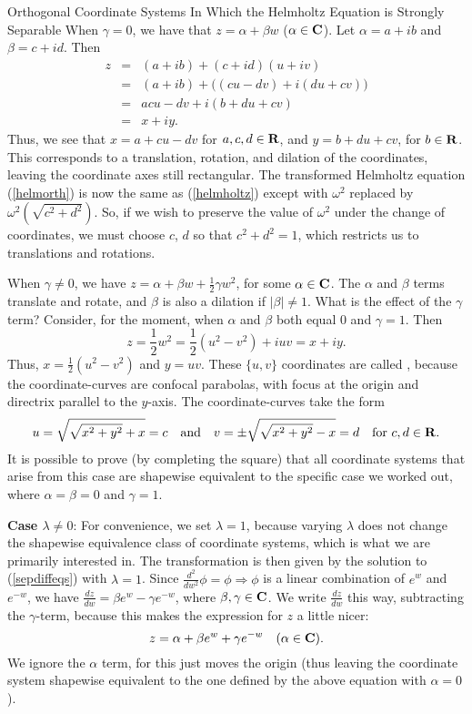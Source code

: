 \begin{section}{Orthogonal Coordinate Systems In Which the Helmholtz Equation is Strongly Separable}
When $\gamma = 0$, we have that $z = \alpha + \beta w$ ($\alpha \in \mathbf{C}$).  Let $\alpha = a + ib$ and $\beta = c + id$.  Then
\begin{eqnarray*}
z &=& (a + ib) + (c + id)(u + iv) \\
  &=& (a + ib) + \big( (cu - dv) + i(du + cv)\big) \\
  &=& a cu - dv + i(b + du + cv) \\
  &=& x + iy.
\end{eqnarray*}
Thus, we see that $x = a + c u - d v$ for $a, c, d \in \mathbf{R}$, and $y = b + d u + c v$, for $b \in \mathbf{R}$.  This corresponds to a translation, rotation, and dilation of the coordinates, leaving the coordinate axes still rectangular.  The transformed Helmholtz equation (\ref{helmorth}) is now the same as (\ref{helmholtz}) except with $\omega^2$ replaced by $\omega^2(\sqrt{c^2 + d^2})$.  So, if we wish to preserve the value of $\omega^2$ under the change of coordinates, we must choose $c$, $d$ so that $c^2 + d^2 = 1$, which restricts us to translations and rotations.

When $\gamma \not= 0$, we have $z = \alpha + \beta w + \frac{1}{2} \gamma w^2$, for some $\alpha \in \mathbf{C}$.  The $\alpha$ and $\beta$ terms translate and rotate, and $\beta$ is also a dilation if $| \beta | \not= 1$.  What is the effect of the $\gamma$ term?  Consider, for the moment, when $\alpha$ and $\beta$ both equal $0$ and $\gamma = 1$.  Then
\[
z = \frac{1}{2} w^2 = \frac{1}{2}\left( u^2 - v^2 \right) + i u v = x + iy.
\]
Thus, $x = \frac{1}{2}\left( u^2 - v^2 \right)$ and $y = u v$.  These $\{ u,v \}$ coordinates are called , because the coordinate-curves are confocal parabolas, with focus at the origin and directrix parallel to the $y$-axis.  The coordinate-curves take the form
\[
u = \sqrt{\sqrt{x^2 + y^2} + x} = c
\quad \mbox{and} \quad
v = \pm \sqrt{\sqrt{x^2 + y^2} - x} = d
\quad \mbox{for $c, d \in \mathbf{R}$}.
\]
It is possible to prove (by completing the square) that all coordinate systems that arise from this case are shapewise equivalent to the specific case we worked out, where $\alpha = \beta = 0$ and $\gamma = 1$.

\noindent \textbf{Case $\lambda \not= 0$}: For convenience, we set $\lambda = 1$, because varying $\lambda$ does not change the shapewise equivalence class of coordinate systems, which is what we are primarily interested in.  The transformation is then given by the solution to (\ref{sepdiffeqs}) with $\lambda = 1$.  Since $\frac{d^2}{d w^2}\phi = \phi \Longrightarrow \phi$ is a linear combination of $e^w$ and $e^{-w}$, we have $\frac{d z}{d w} = \beta e^w - \gamma e^{-w}$, where $\beta, \gamma \in \mathbf{C}$.  We write $\frac{d z}{d w}$ this way, subtracting the $\gamma$-term, because this makes the expression for $z$ a little nicer:
\[
z = \alpha + \beta e^w + \gamma e^{-w} \quad \mbox{($\alpha \in \mathbf{C}$)}.
\]
We ignore the $\alpha$ term, for this just moves the origin (thus leaving the coordinate system shapewise equivalent to the one defined by the above equation with $\alpha = 0$).


\end{section}
